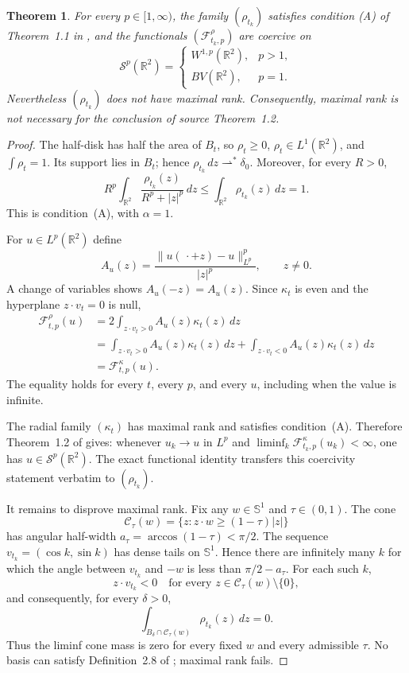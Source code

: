 \documentclass[11pt]{article}
\newtheorem{theorem}{Theorem}
\newcommand{\R}{\mathbb R}
\newcommand{\Sph}{\mathbb S}
\begin{document}
\begin{theorem}
For every $p\in[1,\infty)$, the family $(\rho_{t_k})$ satisfies condition
\emph{(A)} of Theorem~1.1 in \cite{GS}, and the functionals
$(\mathscr F^{\rho}_{t_k,p})$ are coercive on
\[
 \mathcal S^p(\R^2)=
 \begin{cases}
 W^{1,p}(\R^2),&p>1,\\
 BV(\R^2),&p=1.
 \end{cases}
\]
Nevertheless $(\rho_{t_k})$ does not have maximal rank.  Consequently,
maximal rank is not necessary for the conclusion of source Theorem~1.2.
\end{theorem}

\begin{proof}
The half-disk has half the area of $B_t$, so $\rho_t\ge0$,
$\rho_t\in L^1(\R^2)$, and $\int\rho_t=1$.  Its support lies in $B_t$;
hence $\rho_{t_k}\,dz\rightharpoonup^*\delta_0$.  Moreover, for every $R>0$,
\[
 R^p\int_{\R^2}\frac{\rho_{t_k}(z)}{R^p+|z|^p}\,dz
 \le \int_{\R^2}\rho_{t_k}(z)\,dz=1.
\]
This is condition~(A), with $\alpha=1$.

For $u\in L^p(\R^2)$ define
\[
 A_u(z)=\frac{\|u(\,\cdot+z)-u\|_{L^p}^p}{|z|^p},\qquad z\ne0.
\]
A change of variables shows $A_u(-z)=A_u(z)$.  Since $\kappa_t$ is even and
the hyperplane $z\cdot v_t=0$ is null,
\begin{align*}
 \mathscr F^{\rho}_{t,p}(u)
 &=2\int_{z\cdot v_t>0}A_u(z)\kappa_t(z)\,dz\\
 &=\int_{z\cdot v_t>0}A_u(z)\kappa_t(z)\,dz
   +\int_{z\cdot v_t<0}A_u(z)\kappa_t(z)\,dz\\
 &=\mathscr F^{\kappa}_{t,p}(u).
\end{align*}
The equality holds for every $t$, every $p$, and every $u$, including when
the value is infinite.

The radial family $(\kappa_t)$ has maximal rank and satisfies condition~(A).
Therefore Theorem~1.2 of \cite{GS} gives: whenever $u_k\to u$ in $L^p$ and
$\liminf_k\mathscr F^{\kappa}_{t_k,p}(u_k)<\infty$, one has
$u\in\mathcal S^p(\R^2)$.  The exact functional identity transfers this
coercivity statement verbatim to $(\rho_{t_k})$.

It remains to disprove maximal rank.  Fix any $w\in\Sph^1$ and
$\tau\in(0,1)$.  The cone
\[
 \mathcal C_\tau(w)
 =\{z:z\cdot w\ge(1-\tau)|z|\}
\]
has angular half-width $a_\tau=\arccos(1-\tau)<\pi/2$.  The sequence
$v_{t_k}=(\cos k,\sin k)$ has dense tails on $\Sph^1$.  Hence there are
infinitely many $k$ for which the angle between $v_{t_k}$ and $-w$ is less
than $\pi/2-a_\tau$.  For each such $k$,
\[
 z\cdot v_{t_k}<0
 \quad\text{for every }z\in\mathcal C_\tau(w)\setminus\{0\},
\]
and consequently, for every $\delta>0$,
\[
 \int_{B_\delta\cap\mathcal C_\tau(w)}\rho_{t_k}(z)\,dz=0.
\]
Thus the liminf cone mass is zero for every fixed $w$ and every admissible
$\tau$.  No basis can satisfy Definition~2.8 of \cite{GS}; maximal rank
fails.
\end{proof}
\end{document}

